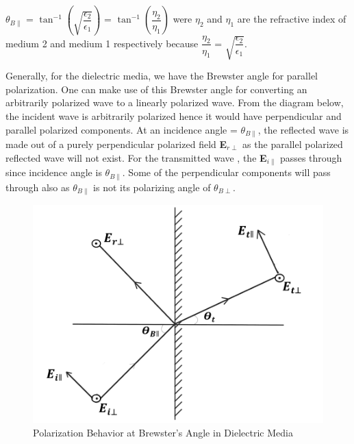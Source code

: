 $\theta_{B\parallel}$ = $\tan^{-1}\left(\sqrt{\dfrac{\epsilon_2}{\epsilon_1}}\right)$ = $\tan^{-1}\left(\dfrac{\eta_2}{\eta_1}\right)$ were $\eta_2$ and $\eta_1$ are the refractive index of medium 2 and medium 1 respectively because $\dfrac{\eta_2}{\eta_1}$ = $\sqrt{\dfrac{\epsilon_2}{\epsilon_1}}$.

Generally, for the dielectric media, we have the Brewster angle for parallel polarization. One can make use of this Brewster angle for converting an arbitrarily polarized wave to a linearly polarized wave. From the diagram below, the incident wave is arbitrarily polarized hence it would have perpendicular and parallel polarized components. At an incidence angle = $\theta_{B\parallel}$, the reflected wave is made out of a purely perpendicular polarized field \textbf{E}$_{r\perp}$ as the parallel polarized reflected wave will not exist. For the transmitted wave , the \textbf{E}$_{i\parallel}$ passes through since incidence angle is $\theta_{B\parallel}$. Some of the perpendicular components will pass through also as $\theta_{B\parallel}$ is not its polarizing angle of $\theta_{B\perp}$.

\begin{figure}[h]
\centering
\includegraphics[width=1\linewidth]{graphics/No_parallel_reflected_wave}
\caption{Polarization Behavior at Brewster's Angle in Dielectric Media}
\label{}
\end{figure}

